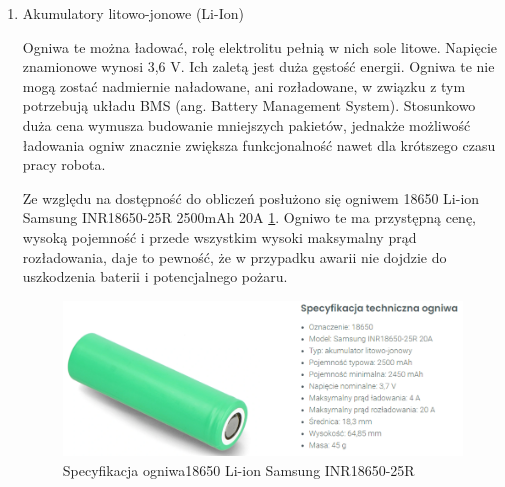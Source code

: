 \documentclass{report}
\begin{document}
\begin{enumerate}[label=(\Alph*)]
    Następnym problemem jest jednorazowość ogniw, jeśli wypadkowa pojemność będzie zbyt mała to używanie ich szybko przestanie być opłacalne. Należy także zwrócić uwagę na to by wypadkowe napięcie nie spadło poniżej 3 V, czyli dla pakietu 3 baterii szeregowych (3S) 1 V na każdej baterii, a dla 4 ogniw szeregowych (4S) 0,75 V. Z wykresu spadków napięć \ref{fig:duracell} widać, że dla prądu 1 A, czas ten nie przekracza nawet 1,5 godziny. Nawet z zgrubnych obliczeń, przyjmując, że prąd obciążenia jednego silnika wynosi 600 mA, pobór prądu robota będzie wynosił 2,4 A. By ograniczyć pobór prądu na jednym pakiecie ogniw szeregowych, należy połączyć je równolegle pięciokrotnie (5P), robot będzie wtedy wstanie pracować w układzie 3-szeregowym (3S5P) przez około 2 godziny i 45 minut, w układzie 4-szeregowym (4S5P) czas ten wydłuży się w przybliżeniu do niecałych 3 godzin. W przypadku zwarcia silnika, baterie te zostaną gwałtownie rozładowane i czas pracy robota znacząco spadnie. 
    
    Praca robota nie przekracza trzech godzin, a żeby osiągnąć taki wynik trzeba użyć 15 do 20 baterii. Podsumowując, użycie ogniw alkalicznych jest nieopłacalne.

    \item Akumulatory litowo-jonowe (Li-Ion)

    Ogniwa te można ładować, rolę elektrolitu pełnią w nich sole litowe. Napięcie znamionowe wynosi 3,6 V. Ich zaletą jest duża gęstość energii. Ogniwa te nie mogą zostać nadmiernie naładowane, ani rozładowane, w związku z tym potrzebują układu BMS (ang. Battery Management System). Stosunkowo duża cena wymusza budowanie mniejszych pakietów, jednakże możliwość ładowania ogniw znacznie zwiększa funkcjonalność nawet dla krótszego czasu pracy robota.
    
    Ze względu na dostępność do obliczeń posłużono się ogniwem 18650 Li-ion Samsung INR18650-25R 2500mAh 20A \ref{fig:spec-18650}. Ogniwo te ma przystępną cenę, wysoką pojemność i przede wszystkim wysoki maksymalny prąd rozładowania, daje to pewność, że w przypadku awarii nie dojdzie do uszkodzenia baterii i potencjalnego pożaru.

    \begin{figure}[H]
        \centering
        \includegraphics{src/tech_specifications/Li-ion Samsung INR18650-25R .png}
        \caption{Specyfikacja ogniwa18650 Li-ion Samsung INR18650-25R }
        \label{fig:spec-18650}
    \end{figure}


\end{enumerate}
\end{document}
